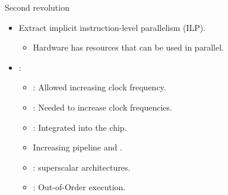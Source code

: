 \begin{frame}[t]{Second revolution}
\begin{itemize}
  \item Extract implicit instruction-level parallelism (ILP).
    \begin{itemize}
      \item Hardware has resources that can be used in parallel.
    \end{itemize}
  \vfill
  \pause
  \item {}:
    \begin{itemize}[<+->]
      \item {}: Allowed increasing clock frequency.
      \item {}: Needed to increase clock frequencies.
      \item {}: Integrated into the chip.
      \item Increasing pipeline  and .
      \item {}: superscalar architectures.
      \item {}: Out-of-Order execution.
    \end{itemize}
\end{itemize}
\end{frame}

